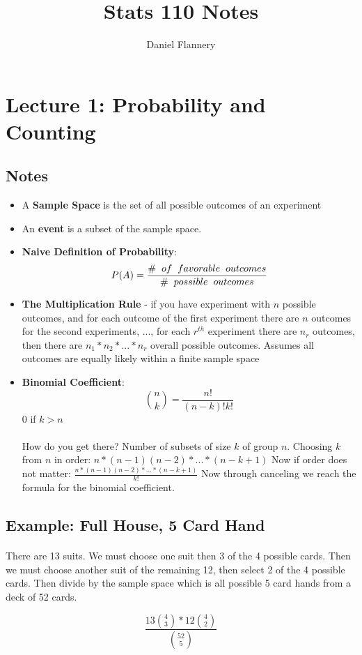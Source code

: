 \documentclass[11pt, oneside]{article}   	%
\title{Stats 110 Notes}
\author{Daniel Flannery}
\begin{document}
\maketitle
\tableofcontents

\section{Lecture 1: Probability and Counting}					
	\subsection{Notes}
	\begin{itemize}
		\item A \textbf{Sample Space} is the set of all possible outcomes of an experiment
		\item An \textbf{event} is a subset of the sample space.
		\item \textbf{Naive Definition of Probability}: \[P(A) = \frac{\# \hspace{2mm} of \hspace{2mm} favorable \hspace{2mm} outcomes}{\# \hspace{2mm} possible \hspace{2mm} outcomes}\]
		\item \textbf{The Multiplication Rule} - if you have experiment with $n$ possible outcomes, and for each outcome of the first experiment there 		are $n$ outcomes for the second experiments, ..., for each $r^{th}$ experiment there are $n_{r}$ outcomes, then there are $n_{1}*n_{2}*...*n_{r}$ overall possible outcomes.
		Assumes all outcomes are equally likely within a finite sample space
		\item \textbf{Binomial Coefficient}: \[ \binom{n}{k} = \frac{n!}{(n-k)!k!} \] $0$ if $k > n$\\
		\\
		How do you get there?
		Number of subsets of size $k$ of group $n$. Choosing $k$ from $n$ in order: $n*(n-1)(n-2)*...*(n-k+1)$
		Now if order does not matter: $\frac{n*(n-1)(n-2)*...*(n-k+1)}{k!}$
		Now through canceling we reach the formula for the binomial coefficient.
		\end{itemize}
	\subsection{Example: Full House, 5 Card Hand}
		\paragraph{}
			There are 13 suits. We must choose one suit then 3 of the 4 possible cards. Then we must choose another suit of the remaining 12, then select 2 of the 4 possible cards. Then divide by the sample space which is all possible 5 card hands from a deck of 52 cards.
		\begin{center}
			\[ \frac{13\binom{4}{3} * 12\binom{4}{2}}{\binom{52}{5}} \]
		\end{center}
\end{document}
